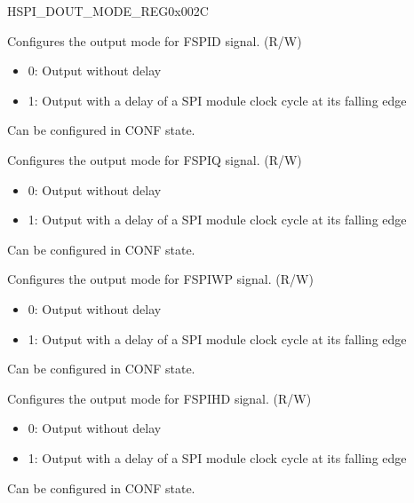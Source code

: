 \begin{register}{H}{SPI\_DOUT\_MODE\_REG}{0x002C}\label{regdesc:SPIDOUTMODEREG}
%
%
%
%
%
\regnewline%
\begin{regdesc}\begin{reglist}
\label{fielddesc:SPIDOUT0MODE}\item [SPI\_DOUT0\_MODE] Configures the output mode for FSPID signal. (R/W)\\
\begin{itemize}
    \item 0: Output without delay
    \item 1: Output with a delay of a SPI module clock cycle at its falling edge
\end{itemize}
Can be configured in CONF state. 
\label{fielddesc:SPIDOUT1MODE}\item [SPI\_DOUT1\_MODE] Configures the output mode for FSPIQ signal. (R/W)\\
\begin{itemize}
    \item 0: Output without delay
    \item 1: Output with a delay of a SPI module clock cycle at its falling edge
\end{itemize}
Can be configured in CONF state. 
\label{fielddesc:SPIDOUT2MODE}\item [SPI\_DOUT2\_MODE] Configures the output mode for FSPIWP signal. (R/W)\\
\begin{itemize}
    \item 0: Output without delay
    \item 1: Output with a delay of a SPI module clock cycle at its falling edge
\end{itemize}
Can be configured in CONF state. 
\label{fielddesc:SPIDOUT3MODE}\item [SPI\_DOUT3\_MODE] Configures the output mode for FSPIHD signal. (R/W)\\
\begin{itemize}
    \item 0: Output without delay
    \item 1: Output with a delay of a SPI module clock cycle at its falling edge
\end{itemize}
Can be configured in CONF state. 
\end{reglist}\end{regdesc}
\end{register}

